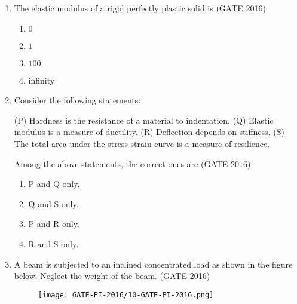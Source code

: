 \documentclass[journal,12pt,onecolumn]{IEEEtran}
\theoremstyle{remark}
\begin{document}
\begin{enumerate}
\begin{multicols}{4}
\begin{enumerate}
    \item $0$
    \item $\tfrac{1}{2}$
    \item $1 - \tfrac{1}{e}$
    \item $1$
\end{enumerate}
\end{multicols}
\vspace{1cm}

\item The elastic modulus of a rigid perfectly plastic solid is  
\hfill{(GATE 2016)}

\begin{multicols}{4}
\begin{enumerate}
    \item $0$
    \item $1$
    \item $100$
    \item infinity
\end{enumerate}
\end{multicols}
\vspace{1cm}

\item Consider the following statements:  

(P) Hardness is the resistance of a material to indentation.  
(Q) Elastic modulus is a measure of ductility.  
(R) Deflection depends on stiffness.  
(S) The total area under the stress-strain curve is a measure of resilience.  

Among the above statements, the correct ones are  
\hfill{(GATE 2016)}

\begin{multicols}{4}
\begin{enumerate}
    \item P and Q only.
    \item Q and S only.
    \item P and R only.
    \item R and S only.
\end{enumerate}
\end{multicols}
\vspace{1cm}
\newpage
\item A beam is subjected to an inclined concentrated load as shown in the figure below. 
Neglect the weight of the beam.  
\hfill{(GATE 2016)}
\begin{figure}[H]
    \centering
    \texttt{[image: GATE-PI-2016/10-GATE-PI-2016.png]}
    \caption{}
    \label{q10}
\end{figure}


\end{enumerate}
\end{document}
